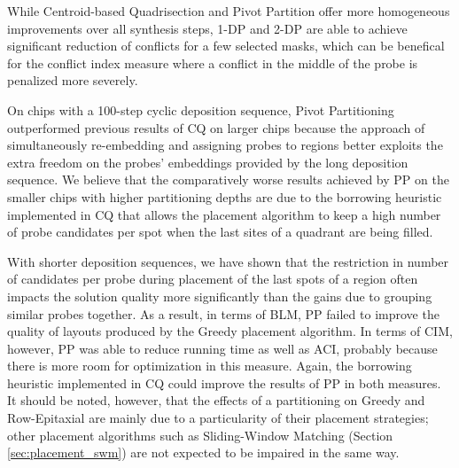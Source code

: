 While Centroid-based Quadrisection and Pivot Partition offer more homogeneous
improvements over all synthesis steps, 1-DP and 2-DP are able to achieve
significant reduction of conflicts for a few selected masks, which can be
benefical for the conflict index measure where a conflict in the middle of the
probe is penalized more severely.

On chips with a 100-step cyclic deposition sequence, Pivot Partitioning
outperformed previous results of CQ on larger chips because the approach of
simultaneously re-embedding and assigning probes to regions better exploits the
extra freedom on the probes' embeddings provided by the long deposition
sequence. We believe that the comparatively worse results achieved by PP on the
smaller chips with higher partitioning depths are due to the borrowing heuristic
implemented in CQ that allows the placement algorithm to keep a high number of
probe candidates per spot when the last sites of a quadrant are being filled.

With shorter deposition sequences, we have shown that the restriction in number
of candidates per probe during placement of the last spots of a region often
impacts the solution quality more significantly than the gains due to grouping
similar probes together. As a result, in terms of BLM, PP failed to improve the
quality of layouts produced by the Greedy placement algorithm. In terms of CIM,
however, PP was able to reduce running time as well as ACI, probably because
there is more room for optimization in this measure. Again, the borrowing
heuristic implemented in CQ could improve the results of PP in both measures. It
should be noted, however, that the effects of a partitioning on Greedy and
Row-Epitaxial are mainly due to a particularity of their placement strategies;
other placement algorithms such as Sliding-Window Matching (Section
\ref{sec:placement_swm}) are not expected to be impaired in the same way.
